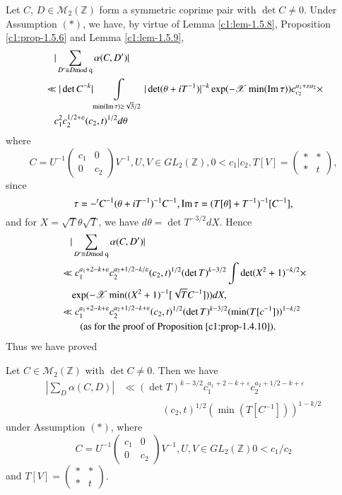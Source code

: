 Let $C$, $D\in\mathscr{M}_{2}(\mathbb{Z})$ form a symmetric coprime
pair with $\det C\neq 0$. Under Assumption $(\ast)$, we have, by
virtue of Lemma \ref{c1:lem-1.5.8}, Proposition \ref{c1:prop-1.5.6} and
Lemma \ref{c1:lem-1.5.9}, 
\begin{align*}
&\quad |\sum_{D'\equiv D\rm{mod} \; q}\alpha(C,D')|\\
&\ll |\det C^{-k}|\int\limits_{\min(\operatorname{Im} \tau)\geq
    \sqrt{3}/2}|\det(\theta+iT^{-1})|^{-k}\exp(-\mathscr{X}\min(\operatorname{Im}
  \tau))c^{a_{1}+\varepsilon a_{2}}_{c_{2}}\times\\
&\quad c^{2}_{1}c^{1/2+\varepsilon}_{2}(c_{2},t)^{1/2}d\theta
\end{align*}
where
$$ 
C=U^{-1}
\begin{pmatrix}
c_{1} & 0\\
0 & c_{2}
\end{pmatrix}
V^{-1}, U, V \in GL_{2}(\mathbb{Z}), 0 <c_{1}|c_{2}, T[V]=
\begin{pmatrix}
\ast & \ast\\
\ast & t
\end{pmatrix},
$$
since
$$
\tau=-{}^{t}C^{-1}(\theta + iT^{-1})^{-1}C^{-1},\operatorname{Im}\tau  =
(T[\theta]+T^{-1})^{-1}[C^{-1}],
$$
and for $X=\sqrt{T}\theta\sqrt{T}$, we have $d\theta=\det
T^{-3/2}dX$. Hence
\begin{align*}
&\quad |\sum_{D'\equiv D\rm{mod} \; q}\alpha(C,D')|\\
&\ll
  c_{1}^{a_{1}+2-k+\varepsilon}c_{2}^{a_{2}+1/2-k/\varepsilon}(c_{2},t)^{1/2}(\det
  T)^{k-3/2}\int \det (X^{2}+1)^{-k/2}\times\\
&\quad \exp(-\mathscr{X}\min ((X^{2}+1)^{-1}[\sqrt{T}C^{-1}]))dX,\\
&\ll
  c_{1}^{a_{1}+2-k+\varepsilon}c_{2}^{a_{2}+1/2-k+\varepsilon}(c_{2},t)^{1/2}(\det
  T)^{k-3/2}(\min (T[c^{-1}]))^{1-k/2}\\
&\qquad \text{(as for the proof of Proposition \ref{c1:prop-1.4.10}).}
\end{align*}\pageoriginale
Thus we have proved

\begin{sublemma}\label{c1:lem-1.5.10}
Let $C\in\mathscr{M}_{2}(\mathbb{Z})$ with $\det C\neq 0$. Then we
have
\begin{align*}
\left|\sum_{D}\alpha(C,D)\right|&\ll(\det
T)^{k-3/2}c_{1}^{a_{1}+2-k+\varepsilon}c_{2}^{a_{2}+1/2-k+\varepsilon}\\
&\qquad\qquad (c_{2},t)^{1/2}(\min (T[C^{-1}]))^{1-k/2} 
\end{align*}
under Assumption $(\ast)$, where 
$$
C=U^{-1}
\begin{pmatrix}
c_{1} & 0\\ 
0 & c_{2}
\end{pmatrix}
V^{-1}, U, V\in GL_{2}(\mathbb{Z})0< c_{1} / c_{2}
$$
and $T[V]=\left(\begin{smallmatrix} \ast & \ast\\ \ast & t
\end{smallmatrix}\right)$.
\end{sublemma}

